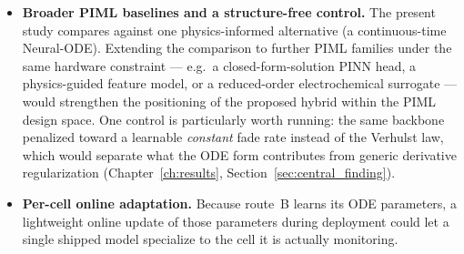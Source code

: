 \begin{itemize}
    settle the accuracy question and re-test the uncertainty weighting where it
    is expected to matter.
    \item \textbf{Broader PIML baselines and a structure-free control.} The
    present study compares against one physics-informed alternative (a
    continuous-time Neural-ODE). Extending the comparison to further PIML
    families under the same hardware constraint --- e.g.\ a
    closed-form-solution PINN head, a physics-guided feature model, or a
    reduced-order electrochemical surrogate --- would strengthen the positioning
    of the proposed hybrid within the PIML design space. One control is
    particularly worth running: the same backbone penalized toward a learnable
    \emph{constant} fade rate instead of the Verhulst law, which would separate
    what the ODE form contributes from generic derivative regularization
    (Chapter~\ref{ch:results}, Section~\ref{sec:central_finding}).
    \item \textbf{Per-cell online adaptation.} Because route~B learns its ODE
    parameters, a lightweight online update of those parameters during deployment
    could let a single shipped model specialize to the cell it is actually
    monitoring.
\end{itemize}
